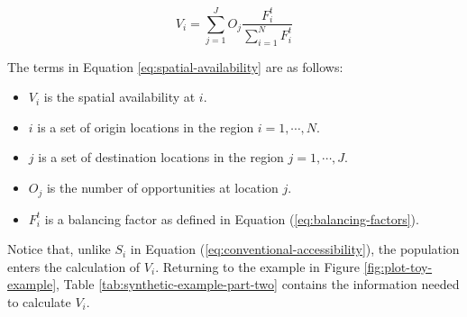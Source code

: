 \documentclass[]{elsarticle} %
\providecommand{\tightlist}{%
  \setlength{\itemsep}{0pt}\setlength{\parskip}{0pt}}
\begin{document}
\begin{equation}
\label{eq:spatial-availability}
V_{i} = \sum_{j=1}^J O_j\frac{F^t_{i}}{\sum_{i=1}^N F^t_{i}}
\end{equation}

The terms in Equation \ref{eq:spatial-availability} are as follows:

\begin{itemize}
\tightlist
\item
  \(V_{i}\) is the spatial availability at \(i\).
\item
  \(i\) is a set of origin locations in the region \(i = 1,\cdots, N\).
\item
  \(j\) is a set of destination locations in the region
  \(j = 1,\cdots,J\).
\item
  \(O_j\) is the number of opportunities at location \(j\).
\item
  \(F^t_{i}\) is a balancing factor as defined in Equation
  (\ref{eq:balancing-factors}).
\end{itemize}

Notice that, unlike \(S_i\) in Equation
(\ref{eq:conventional-accessibility}), the population enters the
calculation of \(V_{i}\). Returning to the example in Figure
\ref{fig:plot-toy-example}, Table \ref{tab:synthetic-example-part-two}
contains the information needed to calculate \(V_i\).

 
  \providecommand{\huxb}[2]{\arrayrulecolor[RGB]{#1}\global\arrayrulewidth=#2pt}
  \providecommand{\huxvb}[2]{\color[RGB]{#1}\vrule width #2pt}
  \providecommand{\huxtpad}[1]{\rule{0pt}{#1}}
  \providecommand{\huxbpad}[1]{\rule[-#1]{0pt}{#1}}
\end{document}
